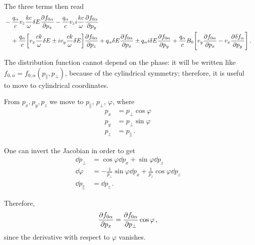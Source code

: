 \documentclass[main.tex]{subfiles}
\begin{document}
The three terms then read 
%
\begin{align}
\begin{split}
& - \frac{q_\alpha}{c} v_z \frac{kc}{ \omega } \delta E \pdv{f_{0 \alpha }}{p_x}
- \frac{q_\alpha}{c} v_z i \frac{kc}{\omega }
\pdv{f_{0 \alpha }}{p_y} 
\\
&\phantom{=}\ + \frac{q_\alpha}{c} \qty[v_x \frac{ck}{\omega } \delta E \pm i v_y \frac{ck}{\omega } \delta E] \pdv{f_{0 \alpha }}{p_z} 
+ q_\alpha \delta E \pdv{ f_{0 \alpha} }{p_x} \pm q_\alpha i \delta E \pdv{f_{0 \alpha }}{p_y} + \frac{q_\alpha}{c} 
B_0 \qty[v_y \pdv{f_{0 \alpha }}{p_x} - v_x \pdv{ \delta f_\alpha }{p_y}]
\,.
\end{split}
\end{align}

The distribution function cannot depend on the phase: it will be written like \(f_{0, \alpha } = f_{0, \alpha } (p_{\parallel}, p_\perp)\), because of the cylindrical symmetry; 
therefore, it is useful to move to cylindrical coordinates. 

From \(p_x, p_y, p_z\) we move to \(p_\parallel\), \(p_\perp\), \(\varphi \), where 
%
\begin{align}
p_x &= p_\perp \cos \varphi \\
p_y &= p_\perp \sin \varphi \\
p_z &= p_\parallel
\,.
\end{align}

One can invert the Jacobian in order to get 
%
\begin{align}
\dd{p_\perp} &= \cos \varphi \dd{p_x} + \sin \varphi \dd{p_z}  \\
\dd{\varphi } &= - \frac{1}{p_\perp} \sin \varphi \dd{p_x} + \frac{1}{p_z} \cos \varphi \dd{p_z}  \\
\dd{p_\parallel} &= \dd{p_z}
\,.
\end{align}

Therefore, 
%
\begin{align}
\pdv{ f_{0 \alpha }}{p_x} = \pdv{ f_{0 \alpha }}{p_\perp} \cos \varphi 
\,,
\end{align}
%
since the derivative with respect to \(\varphi \) vanishes. 
\end{document}
